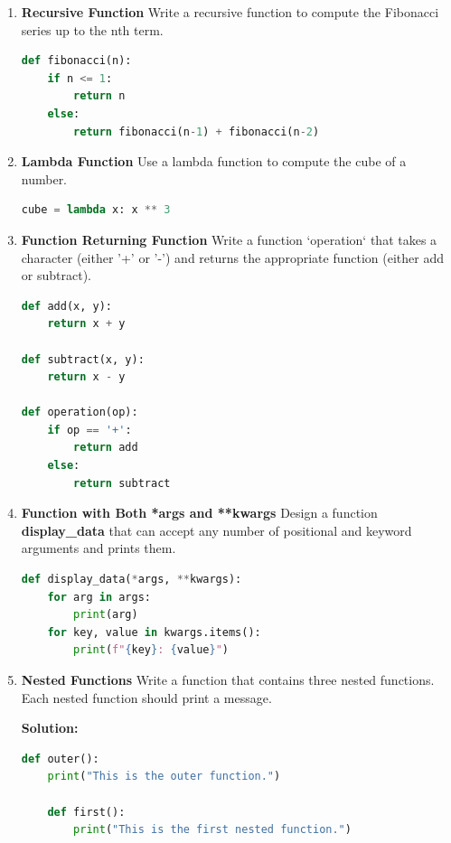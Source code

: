 \documentclass[12pt]{book}
\begin{document}
\begin{enumerate}
\item \textbf{Recursive Function}
Write a recursive function to compute the Fibonacci series up to the nth term.


\begin{lstlisting}[language=Python]
def fibonacci(n):
    if n <= 1:
        return n
    else:
        return fibonacci(n-1) + fibonacci(n-2)
\end{lstlisting}

\item \textbf{Lambda Function}
Use a lambda function to compute the cube of a number.


\begin{lstlisting}[language=Python]
cube = lambda x: x ** 3
\end{lstlisting}

\item \textbf{Function Returning Function}
Write a function `operation` that takes a character (either '+' or '-') and returns the appropriate function (either add or subtract).


\begin{lstlisting}[language=Python]
def add(x, y):
    return x + y

def subtract(x, y):
    return x - y

def operation(op):
    if op == '+':
        return add
    else:
        return subtract
\end{lstlisting}

\item \textbf{Function with Both *args and **kwargs}
Design a function \textbf{display\_data} that can accept any number of positional and keyword arguments and prints them.


\begin{lstlisting}[language=Python]
def display_data(*args, **kwargs):
    for arg in args:
        print(arg)
    for key, value in kwargs.items():
        print(f"{key}: {value}")
\end{lstlisting}

\item \textbf{Nested Functions}
Write a function that contains three nested functions. Each nested function should print a message.

\textbf{Solution:}
\begin{lstlisting}[language=Python]
def outer():
    print("This is the outer function.")

    def first():
        print("This is the first nested function.")


\end{lstlisting}
\end{enumerate}
\end{document}
